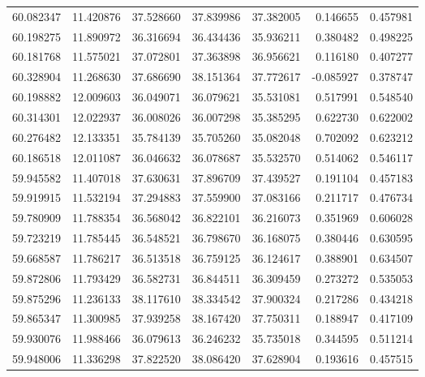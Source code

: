 \begin{tabular}{rrrrrrr}
 60.082347 &  11.420876 &         37.528660 &         37.839986 &         37.382005 &  0.146655 &  0.457981 \\
 60.198275 &  11.890972 &         36.316694 &         36.434436 &         35.936211 &  0.380482 &  0.498225 \\
 60.181768 &  11.575021 &         37.072801 &         37.363898 &         36.956621 &  0.116180 &  0.407277 \\
 60.328904 &  11.268630 &         37.686690 &         38.151364 &         37.772617 & -0.085927 &  0.378747 \\
 60.198882 &  12.009603 &         36.049071 &         36.079621 &         35.531081 &  0.517991 &  0.548540 \\
 60.314301 &  12.022937 &         36.008026 &         36.007298 &         35.385295 &  0.622730 &  0.622002 \\
 60.276482 &  12.133351 &         35.784139 &         35.705260 &         35.082048 &  0.702092 &  0.623212 \\
 60.186518 &  12.011087 &         36.046632 &         36.078687 &         35.532570 &  0.514062 &  0.546117 \\
 59.945582 &  11.407018 &         37.630631 &         37.896709 &         37.439527 &  0.191104 &  0.457183 \\
 59.919915 &  11.532194 &         37.294883 &         37.559900 &         37.083166 &  0.211717 &  0.476734 \\
 59.780909 &  11.788354 &         36.568042 &         36.822101 &         36.216073 &  0.351969 &  0.606028 \\
 59.723219 &  11.785445 &         36.548521 &         36.798670 &         36.168075 &  0.380446 &  0.630595 \\
 59.668587 &  11.786217 &         36.513518 &         36.759125 &         36.124617 &  0.388901 &  0.634507 \\
 59.872806 &  11.793429 &         36.582731 &         36.844511 &         36.309459 &  0.273272 &  0.535053 \\
 59.875296 &  11.236133 &         38.117610 &         38.334542 &         37.900324 &  0.217286 &  0.434218 \\
 59.865347 &  11.300985 &         37.939258 &         38.167420 &         37.750311 &  0.188947 &  0.417109 \\
 59.930076 &  11.988466 &         36.079613 &         36.246232 &         35.735018 &  0.344595 &  0.511214 \\
 59.948006 &  11.336298 &         37.822520 &         38.086420 &         37.628904 &  0.193616 &  0.457515 \\

\end{tabular}
